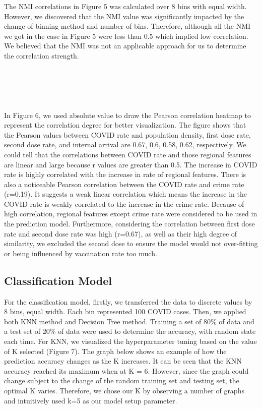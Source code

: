 \documentclass[a4, 11pt]{article}
\begin{document}
The NMI correlations in Figure 5 was calculated over 8 bins with equal width. However, we discovered that the NMI value was significantly impacted by the change of binning method and number of bins. Therefore, although all the NMI we got in the case in Figure 5 were less than 0.5 which implied low correlation. We believed that the NMI was not an applicable approach for us to determine the correlation strength.\\\\\\\\\\\\
In Figure 6, we used absolute value to draw the Pearson correlation heatmap to represent the correlation degree for better visualization. The figure shows that the Pearson values between COVID rate and population density, first dose rate, second dose rate, and internal arrival are 0.67, 0.6, 0.58, 0.62, respectively. We could tell that the correlations between COVID rate and those regional features are linear and large because r values are greater than 0.5. The increase in COVID rate is highly correlated with the increase in rate of regional features. There is also a noticeable Pearson correlation between the COVID rate and crime rate (r=0.19). It suggests a weak linear correlation which means the increase in the COVID rate is weakly correlated to the increase in the crime rate. Because of high correlation, regional features except crime rate were considered to be used in the prediction model. Furthermore, considering the correlation between first dose rate and second dose rate was high (r=0.67), as well as their high degree of similarity, we excluded the second dose to ensure the model would not over-fitting or being influenced by vaccination rate too much. 


\newpage
\subsection{Classification Model}
For the classification model, firstly, we transferred the data to discrete values by 8 bins, equal width. Each bin represented 100 COVID cases. Then, we applied both KNN method and Decision Tree method. Training a set of 80\% of data and a test set of 20\% of data were used to determine the accuracy, with random state each time.
For KNN, we visualized the hyperparameter tuning based on the value of K selected (Figure 7). The graph below shows an example of how the prediction accuracy changes as the K increases. It can be seen that the KNN accuracy reached its maximum when at K = 6. However, since the graph could change subject to the change of the random training set and testing set, the optimal K varies. Therefore, we chose our K by observing a number of graphs and intuitively used k=5 as our model setup parameter.
\end{document}
